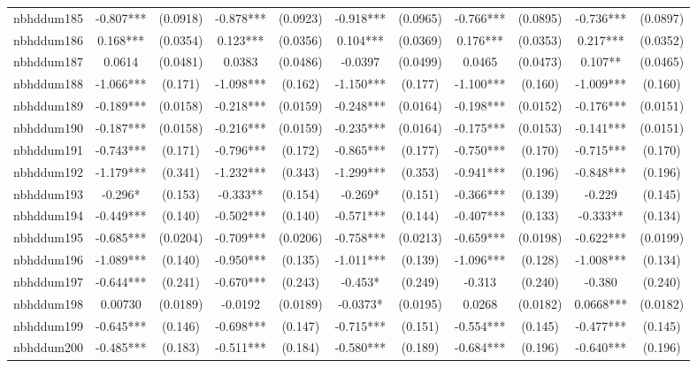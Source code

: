 \documentclass[]{article}
\begin{document}
\begin{tabular}{lcccccccccc}
nbhddum185 & -0.807*** & (0.0918) & -0.878*** & (0.0923) & -0.918*** & (0.0965) & -0.766*** & (0.0895) & -0.736*** & (0.0897) \\
nbhddum186 & 0.168*** & (0.0354) & 0.123*** & (0.0356) & 0.104*** & (0.0369) & 0.176*** & (0.0353) & 0.217*** & (0.0352) \\
nbhddum187 & 0.0614 & (0.0481) & 0.0383 & (0.0486) & -0.0397 & (0.0499) & 0.0465 & (0.0473) & 0.107** & (0.0465) \\
nbhddum188 & -1.066*** & (0.171) & -1.098*** & (0.162) & -1.150*** & (0.177) & -1.100*** & (0.160) & -1.009*** & (0.160) \\
nbhddum189 & -0.189*** & (0.0158) & -0.218*** & (0.0159) & -0.248*** & (0.0164) & -0.198*** & (0.0152) & -0.176*** & (0.0151) \\
nbhddum190 & -0.187*** & (0.0158) & -0.216*** & (0.0159) & -0.235*** & (0.0164) & -0.175*** & (0.0153) & -0.141*** & (0.0151) \\
nbhddum191 & -0.743*** & (0.171) & -0.796*** & (0.172) & -0.865*** & (0.177) & -0.750*** & (0.170) & -0.715*** & (0.170) \\
nbhddum192 & -1.179*** & (0.341) & -1.232*** & (0.343) & -1.299*** & (0.353) & -0.941*** & (0.196) & -0.848*** & (0.196) \\
nbhddum193 & -0.296* & (0.153) & -0.333** & (0.154) & -0.269* & (0.151) & -0.366*** & (0.139) & -0.229 & (0.145) \\
nbhddum194 & -0.449*** & (0.140) & -0.502*** & (0.140) & -0.571*** & (0.144) & -0.407*** & (0.133) & -0.333** & (0.134) \\
nbhddum195 & -0.685*** & (0.0204) & -0.709*** & (0.0206) & -0.758*** & (0.0213) & -0.659*** & (0.0198) & -0.622*** & (0.0199) \\
nbhddum196 & -1.089*** & (0.140) & -0.950*** & (0.135) & -1.011*** & (0.139) & -1.096*** & (0.128) & -1.008*** & (0.134) \\
nbhddum197 & -0.644*** & (0.241) & -0.670*** & (0.243) & -0.453* & (0.249) & -0.313 & (0.240) & -0.380 & (0.240) \\
nbhddum198 & 0.00730 & (0.0189) & -0.0192 & (0.0189) & -0.0373* & (0.0195) & 0.0268 & (0.0182) & 0.0668*** & (0.0182) \\
nbhddum199 & -0.645*** & (0.146) & -0.698*** & (0.147) & -0.715*** & (0.151) & -0.554*** & (0.145) & -0.477*** & (0.145) \\
nbhddum200 & -0.485*** & (0.183) & -0.511*** & (0.184) & -0.580*** & (0.189) & -0.684*** & (0.196) & -0.640*** & (0.196) \\

\end{tabular}
\end{document}
